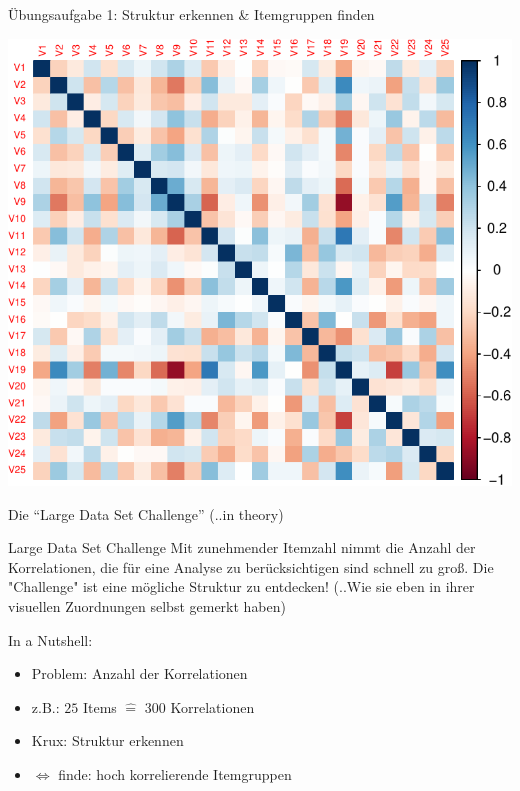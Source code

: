 \documentclass[
  ignorenonframetext,
]{beamer}
\providecommand{\tightlist}{%
  \setlength{\itemsep}{0pt}\setlength{\parskip}{0pt}}
\begin{document}
\begin{frame}{Übungsaufgabe 1: Struktur erkennen \& Itemgruppen finden}
\protect\hypertarget{uxfcbungsaufgabe-1-struktur-erkennen-itemgruppen-finden}{}
\begin{center}\includegraphics[width=0.7\linewidth]{06-EFA_files/figure-beamer/unnamed-chunk-1-1} \end{center}
\end{frame}

\begin{frame}{Die ``Large Data Set Challenge'' (..in theory)}
\protect\hypertarget{die-large-data-set-challenge-..in-theory}{}
\begin{alertblock}{Large Data Set Challenge}
Mit zunehmender Itemzahl nimmt die Anzahl der Korrelationen, die für eine
Analyse zu berücksichtigen sind schnell zu groß. Die "Challenge" ist eine
mögliche Struktur zu entdecken! (..Wie sie eben in ihrer visuellen Zuordnungen
selbst gemerkt haben)
\end{alertblock}

In a Nutshell:

\begin{itemize}
\tightlist
\item
  Problem: Anzahl der Korrelationen
\item
  z.B.: \(25\) Items \(\widehat{=}\) 300 Korrelationen
\item
  Krux: Struktur erkennen
\item
  \(\Leftrightarrow\) finde: hoch korrelierende Itemgruppen
\end{itemize}
\end{frame}
\end{document}
